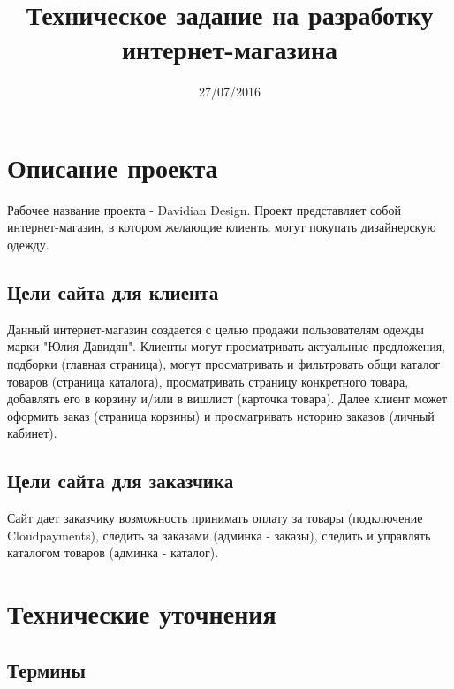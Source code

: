 \documentclass[DIV=calc, paper=a4, fontsize=11pt]{scrartcl} %
\title{Техническое задание на разработку интернет-магазина}
\date{27/07/2016}
\begin{document}
\maketitle

\section{Описание проекта}
Рабочее название проекта - Davidian Design. Проект представляет собой интернет-магазин, в котором желающие клиенты могут покупать дизайнерскую одежду.

\subsection{Цели сайта для клиента}
Данный интернет-магазин создается с целью продажи пользователям одежды марки "Юлия Давидян". Клиенты могут просматривать актуальные предложения, подборки (главная страница), могут просматривать и фильтровать общи каталог товаров (страница каталога), просматривать страницу конкретного товара, добавлять его в корзину и/или в вишлист (карточка товара). Далее клиент может оформить заказ (страница корзины) и просматривать историю заказов (личный кабинет).

\subsection{Цели сайта для заказчика}
Сайт дает заказчику возможность принимать оплату за товары (подключение Cloudpayments), следить за заказами (админка - заказы), следить и управлять каталогом товаров (админка - каталог).


\section{Технические уточнения}

\subsection{Термины}
\end{document}
